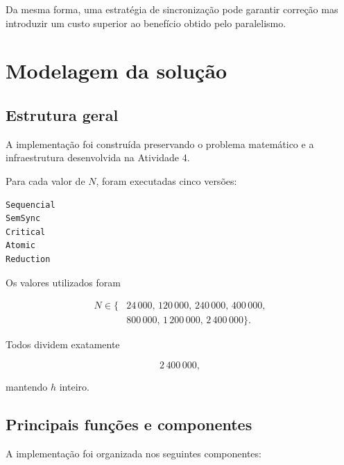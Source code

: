 Da mesma forma, uma estratégia de sincronização pode garantir correção mas
introduzir um custo superior ao benefício obtido pelo paralelismo.


\section{Modelagem da solução}

\label{sec:atvd06-modelagem}

\subsection{Estrutura geral}

A implementação foi construída preservando o problema matemático e a
infraestrutura desenvolvida na Atividade 4.

Para cada valor de \(N\), foram executadas cinco versões:

\begin{verbatim}
Sequencial
SemSync
Critical
Atomic
Reduction
\end{verbatim}

Os valores utilizados foram

\begin{equation}
\begin{split}
N\in\{&
24\,000,\,
120\,000,\,
240\,000,\,
400\,000,\\
&
800\,000,\,
1\,200\,000,\,
2\,400\,000
\}.
\end{split}
\end{equation}

Todos dividem exatamente

\begin{equation}
    2\,400\,000,
\end{equation}

mantendo \(h\) inteiro.


\subsection{Principais funções e componentes}

A implementação foi organizada nos seguintes componentes:

